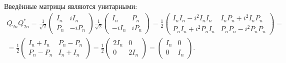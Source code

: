 Введённые матрицы являются унитарными:
\begin{multline*}
    Q_{2n} Q_{2n}^*
    = \frac{1}{\sqrt{2}}
    \begin{pmatrix}
        I_n & i I_n   \\
        P_n & - i P_n
    \end{pmatrix}
    \frac{1}{\sqrt{2}}
    \begin{pmatrix}
        I_n     & P_n   \\
        - i I_n & i P_n
    \end{pmatrix}
    = \frac{1}{2}
    \begin{pmatrix}
        I_n I_n - i^2 I_n I_n & I_n P_n + i^2 I_n P_n \\
        P_n I_n + i^2 P_n I_n & P_n P_n - i^2 P_n P_n
    \end{pmatrix} = \\
    = \frac{1}{2}
    \begin{pmatrix}
        I_n + I_n & P_n - P_n  \\
        P_n - P_n & I_n  + I_n
    \end{pmatrix}
    = \frac{1}{2}
    \begin{pmatrix}
        2 I_n & 0     \\
        0     & 2 I_n
    \end{pmatrix}
    = \begin{pmatrix}
        I_n & 0   \\
        0   & I_n
    \end{pmatrix} .
\end{multline*}

